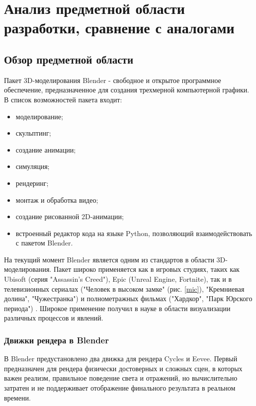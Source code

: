 \section{Анализ предметной области разработки, сравнение с аналогами}

\subsection{Обзор предметной области}
Пакет 3D-моделирования Blender - свободное и открытое программное обеспечение, предназначенное для создания трехмерной компьютерной графики. В список возможностей пакета входит:
\begin{itemize}
	\item моделирование;
	\item скульптинг;
	\item создание анимации;
	\item симуляция;
	\item рендеринг;
	\item монтаж и обработка видео;
	\item создание рисованной 2D-анимации;
	\item встроенный редактор кода на языке Python, позволяющий взаимодействовать с пакетом Blender.
\end{itemize}

На текущий момент Blender является одним из стандартов в области 3D-моделирования. Пакет широко применяется как в игровых студиях, таких как Ubisoft (серия "Assassin's Creed"), Epic (Unreal Engine, Fortnite), так и в телевизионных сериалах ("Человек в высоком замке" (рис. \ref{mic}), "Кремниевая долина", "Чужестранка") и полнометражных фильмах ("Хардкор", "Парк Юрского периода") \cite{guru-ytb}. Широкое применение получил в науке в области визуализации различных процессов и явлений.


\subsubsection{Движки рендера в Blender}

В Blender предустановлено два движка для рендера Cycles и Eevee. Первый предназначен для рендера физически достоверных и сложных сцен, в которых важен реализм, правильное поведение света и отражений, но вычислительно затратен и не поддерживает отображение финального результата в реальном времени.

